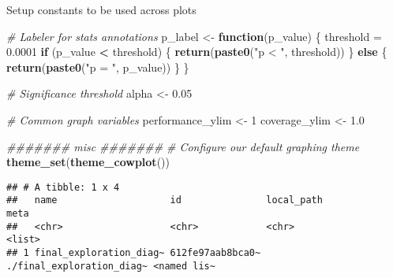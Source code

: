 \documentclass[]{book}
\newenvironment{Shaded}{\begin{snugshade}}{\end{snugshade}}
\newcommand{\CommentTok}[1]{\textcolor[rgb]{0.56,0.35,0.01}{\textit{#1}}}
\newcommand{\ControlFlowTok}[1]{\textcolor[rgb]{0.13,0.29,0.53}{\textbf{#1}}}
\newcommand{\DataTypeTok}[1]{\textcolor[rgb]{0.13,0.29,0.53}{#1}}
\newcommand{\DecValTok}[1]{\textcolor[rgb]{0.00,0.00,0.81}{#1}}
\newcommand{\FloatTok}[1]{\textcolor[rgb]{0.00,0.00,0.81}{#1}}
\newcommand{\KeywordTok}[1]{\textcolor[rgb]{0.13,0.29,0.53}{\textbf{#1}}}
\newcommand{\NormalTok}[1]{#1}
\newcommand{\OperatorTok}[1]{\textcolor[rgb]{0.81,0.36,0.00}{\textbf{#1}}}
\newcommand{\StringTok}[1]{\textcolor[rgb]{0.31,0.60,0.02}{#1}}
\begin{document}
Setup constants to be used across plots

\begin{Shaded}
\begin{Highlighting}[]
\CommentTok{# Labeler for stats annotations}
\NormalTok{p_label <-}\StringTok{ }\ControlFlowTok{function}\NormalTok{(p_value) \{}
\NormalTok{  threshold =}\StringTok{ }\FloatTok{0.0001}
  \ControlFlowTok{if}\NormalTok{ (p_value }\OperatorTok{<}\StringTok{ }\NormalTok{threshold) \{}
    \KeywordTok{return}\NormalTok{(}\KeywordTok{paste0}\NormalTok{(}\StringTok{"p < "}\NormalTok{, threshold))}
\NormalTok{  \} }\ControlFlowTok{else}\NormalTok{ \{}
    \KeywordTok{return}\NormalTok{(}\KeywordTok{paste0}\NormalTok{(}\StringTok{"p = "}\NormalTok{, p_value))}
\NormalTok{  \}}
\NormalTok{\}}

\CommentTok{# Significance threshold}
\NormalTok{alpha <-}\StringTok{ }\FloatTok{0.05}

\CommentTok{# Common graph variables}
\NormalTok{performance_ylim <-}\StringTok{ }\DecValTok{1}
\NormalTok{coverage_ylim <-}\StringTok{ }\FloatTok{1.0}

\CommentTok{####### misc #######}
\CommentTok{# Configure our default graphing theme}
\KeywordTok{theme_set}\NormalTok{(}\KeywordTok{theme_cowplot}\NormalTok{())}
\end{Highlighting}
\end{Shaded}

\begin{Shaded}
\end{Shaded}

\begin{verbatim}
## # A tibble: 1 x 4
##   name                    id               local_path                meta       
##   <chr>                   <chr>            <chr>                     <list>     
## 1 final_exploration_diag~ 612fe97aab8bca0~ ./final_exploration_diag~ <named lis~
\end{verbatim}
\end{document}

